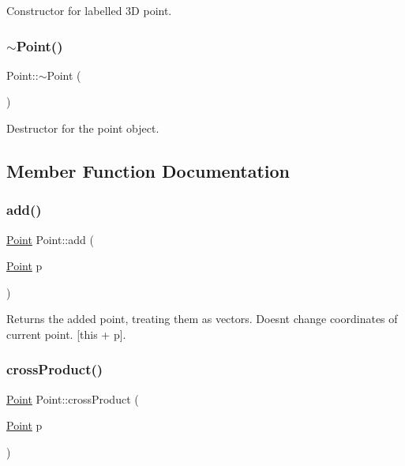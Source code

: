 Constructor for labelled 3D point. 

\mbox{\label{class_point_a395fa04b4ec126b66fc053f829a30cc1}} 
\subsubsection{\texorpdfstring{$\sim$\+Point()}{~Point()}}
{\footnotesize\ttfamily Point\+::$\sim$\+Point (\begin{DoxyParamCaption}{ }\end{DoxyParamCaption})}



Destructor for the point object. 



\subsection{Member Function Documentation}
\mbox{\label{class_point_a8a2ee9e0febd224f86391229e77c2aee}} 
\subsubsection{\texorpdfstring{add()}{add()}}
{\footnotesize\ttfamily \mbox{\hyperlink{class_point}{Point}} Point\+::add (\begin{DoxyParamCaption}\item[{\mbox{\hyperlink{class_point}{Point}}}]{p }\end{DoxyParamCaption})}



Returns the added point, treating them as vectors. Doesn\textquotesingle{}t change coordinates of current point. \mbox{[}this + p\mbox{]}. 

\mbox{\label{class_point_a99b9491fe4a5527eff77a2db8bd01ecf}} 
\subsubsection{\texorpdfstring{cross\+Product()}{crossProduct()}}
{\footnotesize\ttfamily \mbox{\hyperlink{class_point}{Point}} Point\+::cross\+Product (\begin{DoxyParamCaption}\item[{\mbox{\hyperlink{class_point}{Point}}}]{p }\end{DoxyParamCaption})}




